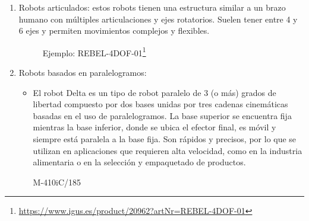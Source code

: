 \begin{enumerate}
\item Robots articulados: estos robots tienen una estructura similar a un brazo humano con múltiples articulaciones y ejes rotatorios. Suelen tener entre 4 y 6 ejes y permiten movimientos complejos y flexibles. 
\begin{figure} [h!]
  \centering    
  \hspace{3cm}
  \caption[REBEL-4DOF-01]{Ejemplo: REBEL-4DOF-01\footnote{\url{https://www.igus.es/product/20962?artNr=REBEL-4DOF-01}}}
\end{figure}



\item Robots basados en paralelogramos:
\begin{itemize}
\item El robot Delta es un tipo de robot paralelo de 3 (o más) grados de libertad compuesto por dos bases unidas por tres cadenas 
cinemáticas basadas en el uso de paralelogramos. La base superior se encuentra fija mientras la base inferior, donde se 
ubica el efector final, es móvil y siempre está paralela a la base fija.
Son rápidos y precisos, por lo que se utilizan en aplicaciones que requieren alta velocidad, como en la 
industria alimentaria o en la selección y empaquetado de productos.

M-410iC/185 


\end{itemize}
\end{enumerate}
